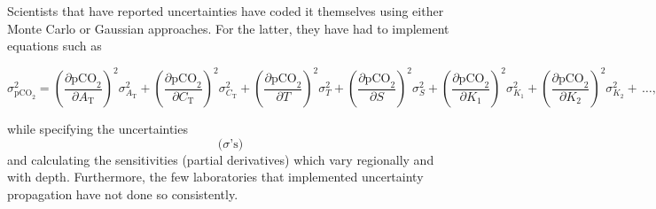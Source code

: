 Scientists that have reported uncertainties have coded it themselves
using either Monte Carlo or Gaussian approaches. For the latter, they
have had to implement equations such as

$$
      \sigma_{\textrm{pCO}_2}^2 =
                    \left(\frac{\partial \textrm{pCO}_2}{\partial A_{\textrm{T}}}\right)^2 \sigma_{A_{\textrm{T}}}^2 
                  + \left(\frac{\partial \textrm{pCO}_2}{\partial C_{\textrm{T}}}\right)^2 \sigma_{C_{\textrm{T}}}^2
                  + \left(\frac{\partial \textrm{pCO}_2}{\partial T}\right)^2 \sigma_T^2
                  + \left(\frac{\partial \textrm{pCO}_2}{\partial S}\right)^2 \sigma_S^2
                  + \left(\frac{\partial \textrm{pCO}_2}{\partial K_1}\right)^2 \sigma_{K_1}^2
                  + \left(\frac{\partial \textrm{pCO}_2}{\partial K_2}\right)^2 \sigma_{K_2}^2
		  + \, \ldots
		  \textrm{,}
$$

while specifying the uncertainties $$ \textrm{(}\sigma\textrm{'s)} $$
and calculating the sensitivities (partial derivatives) which vary
regionally and with depth.  Furthermore, the few laboratories that
implemented uncertainty propagation have not done so consistently.
